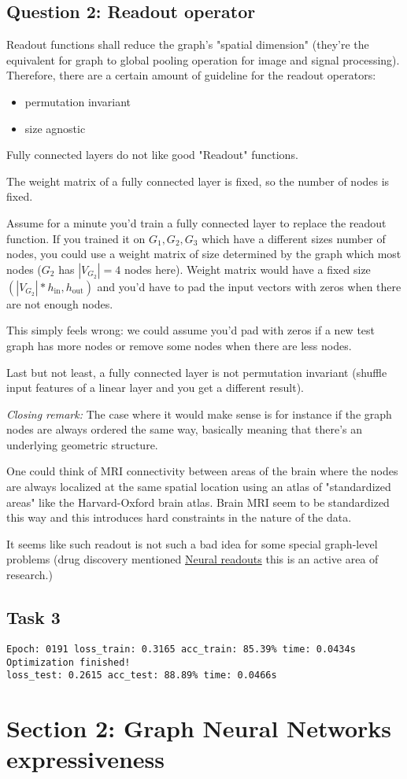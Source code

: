 \documentclass[a4paper]{article}
\begin{document}
\subsection*{Question 2: Readout operator}
Readout functions shall reduce the graph's "spatial dimension" (they're the equivalent for graph to global pooling operation for image and signal processing).
Therefore, there are a certain amount of guideline for the readout operators:
\begin{itemize}
    \item permutation invariant
    \item size agnostic
\end{itemize} 
Fully connected layers do not like good "Readout" functions.

The weight matrix of a fully connected layer is fixed, so the number of nodes is fixed.

Assume for a minute you'd train a fully connected layer to replace the readout function. If you trained it on $G_1, G_2, G_3$ which have a different sizes number of nodes,
you could use a weight matrix of size determined by the graph which most nodes ($G_2$ has $|V_{G_2}|=4$ nodes here).
Weight matrix would have a fixed size $(|V_{G_2}|*h_{\text{in}}, h_{\text{out}} )$ and you'd have to pad the input vectors with zeros when there are not enough nodes.

This simply feels wrong: we could assume you'd pad with zeros if a new test graph has more nodes or remove some nodes when there are less nodes.

Last but not least, a fully connected layer is not permutation invariant (shuffle input features of a linear layer and you get a different result).

\textit{Closing remark:}
The case where it would make sense is for instance if the graph nodes are always ordered the same way, basically meaning that there's an underlying geometric structure.

One could think of MRI connectivity between areas of the brain where the nodes are always localized at the same spatial location using an atlas of "standardized areas" like the Harvard-Oxford brain atlas.
Brain MRI seem to be standardized this way and this introduces hard constraints in the nature of the data.


It seems like such readout is not such a bad idea for some special graph-level problems (drug discovery mentioned \href{https://github.com/davidbuterez/gnn-neural-readouts}{Neural readouts} this is an active area of research.)

\subsection*{Task 3}
\begin{verbatim}
Epoch: 0191 loss_train: 0.3165 acc_train: 85.39% time: 0.0434s
Optimization finished!
loss_test: 0.2615 acc_test: 88.89% time: 0.0466s
\end{verbatim}


\section*{Section 2: Graph Neural Networks expressiveness}
% 
% 
\end{document}
